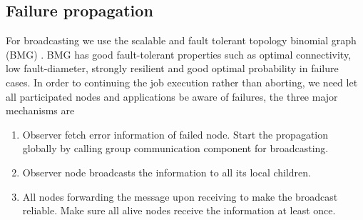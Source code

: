 \documentclass[sigconf]{acmart}
\begin{document}
\subsection{Failure propagation}
For broadcasting we use the scalable and fault tolerant topology binomial graph (BMG) \cite{Angskun07}. BMG has good fault-tolerant properties such as optimal connectivity, low fault-diameter, strongly resilient and good optimal probability in failure cases. In order to continuing the job execution rather than aborting, we need let all participated nodes and applications be aware of failures, the three major mechanisms are 
\begin{enumerate}
  \item Observer fetch error information of failed node. Start the propagation globally by calling group communication component for broadcasting.
  \item Observer node broadcasts the information to all its local children. 
  \item All nodes forwarding the message upon receiving to make the broadcast reliable. Make sure all alive nodes receive the information at least once. 
\end{enumerate}
\end{document}
